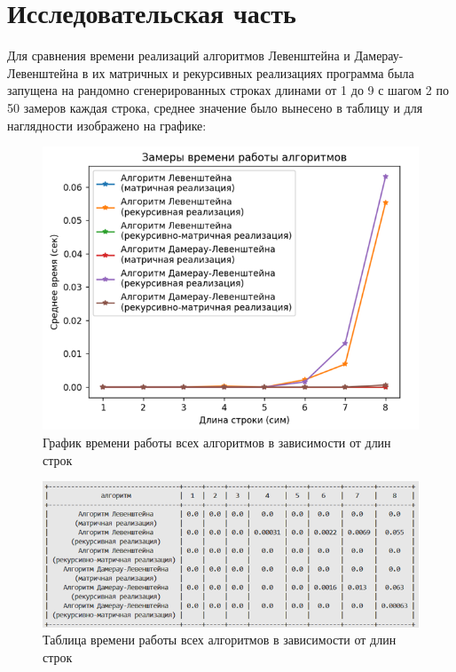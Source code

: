 \section{Исследовательская часть}
Для сравнения времени реализаций алгоритмов Левенштейна и Дамерау-Левенштейна в их матричных и рекурсивных реализациях программа была запущена на рандомно сгенерированных строках длинами от 1 до 9 с шагом 2 по 50 замеров каждая строка, среднее значение было вынесено в таблицу и для наглядности изображено на графике:\par
\begin{figure}[H]
    \centering
    \includegraphics[width=1\textwidth]{img/graph_all.png}
    \caption{График времени работы всех алгоритмов в зависимости от длин строк}
\end{figure}
\begin{figure}[H]
    \centering
    \includegraphics[width=1\textwidth]{img/table_all.png}
    \caption{Таблица времени работы всех алгоритмов в зависимости от длин строк}
\end{figure}
